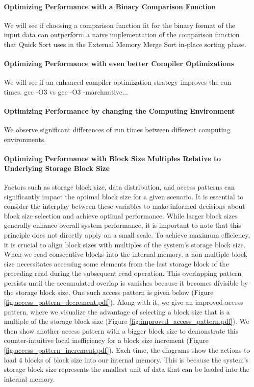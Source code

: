 \documentclass[twocolumn]{article}
\begin{document}
\paragraph*{Optimizing Performance with a Binary Comparison Function}
We will see if choosing a comparison function fit for the binary format of the input data can outperform a naive implementation of the comparison function that Quick Sort uses
in the External Memory Merge Sort in-place sorting phase.  

\paragraph*{Optimizing Performance with even better Compiler Optimizations}
We will see if an enhanced compiler optimization strategy improves the run times. 
gcc -O3 vs gcc -O3 -marchnative...

\paragraph*{Optimizing Performance by changing the Computing Environment}
We observe significant differences of run times between different computing environments. 

\paragraph*{Optimizing Performance with Block Size Multiples Relative to Underlying Storage Block Size}
Factors such as storage block size, data distribution, and access patterns can significantly impact the optimal block size for a given scenario.
It is essential to consider the interplay between these variables to make informed decisions about block size selection and achieve optimal performance.
While larger block sizes generally enhance overall system performance, it is important to note that this principle does not directly apply on a small scale. 
To achieve maximum efficiency, it is crucial to align block sizes with multiples of the system's storage block size.
When we read consecutive blocks into the internal memory, a non-multiple block size necessitates accessing some elements from the last storage block of the 
preceding read during the subsequent read operation. 
This overlapping pattern persists until the accumulated overlap is vanishes because it becomes divisible by the storage block size.
One such access pattern is given below (Figure \ref{fig:access_pattern_decrement.pdf}). Along with it, we give an improved access pattern, where we visualize the advantage of selecting 
a block size that is a multiple of the storage block size (Figure \ref{fig:improved_access_pattern.pdf}). We then show another access pattern with a bigger block size to demonstrate
this counter-intuitive local inefficiency for a block size increment (Figure \ref{fig:access_pattern_increment.pdf}). Each time, the diagrams show the actions to load \( 4 \) blocks of block size 
into our internal memory.
This is because the system's storage block size represents the smallest unit of data that can be loaded into the internal memory.
\end{document}
